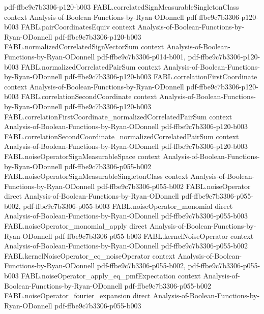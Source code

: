 \begin{theorem}
  {pdf-ffbe9c7b3306-p120-b003}
\proofstep
  {FABL.correlatedSignMeasurableSingletonClass}
  {context}
  {Analysis-of-Boolean-Functions-by-Ryan-ODonnell}
  {pdf-ffbe9c7b3306-p120-b003}
\proofstep
  {FABL.pairCoordinatesEquiv}
  {context}
  {Analysis-of-Boolean-Functions-by-Ryan-ODonnell}
  {pdf-ffbe9c7b3306-p120-b003}
\proofstep
  {FABL.normalizedCorrelatedSignVectorSum}
  {context}
  {Analysis-of-Boolean-Functions-by-Ryan-ODonnell}
  {pdf-ffbe9c7b3306-p014-b001,
    pdf-ffbe9c7b3306-p120-b003}
\proofstep
  {FABL.normalizedCorrelatedPairSum}
  {context}
  {Analysis-of-Boolean-Functions-by-Ryan-ODonnell}
  {pdf-ffbe9c7b3306-p120-b003}
\proofstep
  {FABL.correlationFirstCoordinate}
  {context}
  {Analysis-of-Boolean-Functions-by-Ryan-ODonnell}
  {pdf-ffbe9c7b3306-p120-b003}
\proofstep
  {FABL.correlationSecondCoordinate}
  {context}
  {Analysis-of-Boolean-Functions-by-Ryan-ODonnell}
  {pdf-ffbe9c7b3306-p120-b003}
\proofstep
  {FABL.correlationFirstCoordinate_normalizedCorrelatedPairSum}
  {context}
  {Analysis-of-Boolean-Functions-by-Ryan-ODonnell}
  {pdf-ffbe9c7b3306-p120-b003}
\proofstep
  {FABL.correlationSecondCoordinate_normalizedCorrelatedPairSum}
  {context}
  {Analysis-of-Boolean-Functions-by-Ryan-ODonnell}
  {pdf-ffbe9c7b3306-p120-b003}
\proofstep
  {FABL.noiseOperatorSignMeasurableSpace}
  {context}
  {Analysis-of-Boolean-Functions-by-Ryan-ODonnell}
  {pdf-ffbe9c7b3306-p055-b002}
\proofstep
  {FABL.noiseOperatorSignMeasurableSingletonClass}
  {context}
  {Analysis-of-Boolean-Functions-by-Ryan-ODonnell}
  {pdf-ffbe9c7b3306-p055-b002}
\proofstep
  {FABL.noiseOperator}
  {direct}
  {Analysis-of-Boolean-Functions-by-Ryan-ODonnell}
  {pdf-ffbe9c7b3306-p055-b002,
    pdf-ffbe9c7b3306-p055-b003}
\proofstep
  {FABL.noiseOperator_monomial}
  {direct}
  {Analysis-of-Boolean-Functions-by-Ryan-ODonnell}
  {pdf-ffbe9c7b3306-p055-b003}
\proofstep
  {FABL.noiseOperator_monomial_apply}
  {direct}
  {Analysis-of-Boolean-Functions-by-Ryan-ODonnell}
  {pdf-ffbe9c7b3306-p055-b003}
\proofstep
  {FABL.kernelNoiseOperator}
  {context}
  {Analysis-of-Boolean-Functions-by-Ryan-ODonnell}
  {pdf-ffbe9c7b3306-p055-b002}
\proofstep
  {FABL.kernelNoiseOperator_eq_noiseOperator}
  {context}
  {Analysis-of-Boolean-Functions-by-Ryan-ODonnell}
  {pdf-ffbe9c7b3306-p055-b002,
    pdf-ffbe9c7b3306-p055-b003}
\proofstep
  {FABL.noiseOperator_apply_eq_pmfExpectation}
  {context}
  {Analysis-of-Boolean-Functions-by-Ryan-ODonnell}
  {pdf-ffbe9c7b3306-p055-b002}
\proofstep
  {FABL.noiseOperator_fourier_expansion}
  {direct}
  {Analysis-of-Boolean-Functions-by-Ryan-ODonnell}
  {pdf-ffbe9c7b3306-p055-b003}

\end{theorem}
